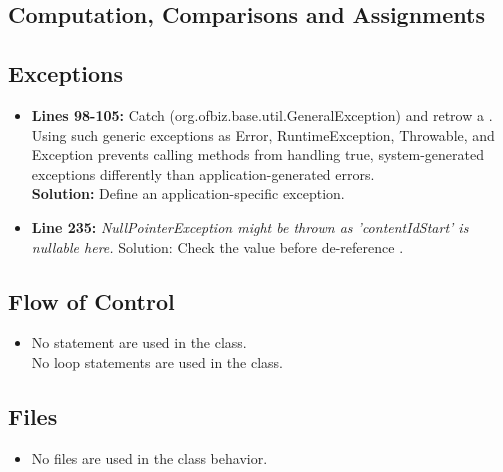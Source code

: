 \subsection{Computation, Comparisons and Assignments}
\subsection{Exceptions}
\begin{itemize}
\item \textbf{Lines 98-105:}
Catch  (org.ofbiz.base.util.GeneralException) and retrow a .
Using such generic exceptions as Error, RuntimeException, Throwable, and Exception prevents calling methods from handling true, system-generated exceptions differently than application-generated errors.\\
\textbf{Solution:} Define an application-specific exception.

\item \textbf{Line 235:} 
\textit{NullPointerException might be thrown as 'contentIdStart' is nullable here.}
Solution: Check the  value before de-reference .
\end{itemize}
\subsection{Flow of Control}
\begin{itemize}
	\item No  statement are used in the class.\\
	No loop statements are used in the class. 
\end{itemize}
\subsection{Files}
\begin{itemize}
	\item No files are used in the class behavior.
\end{itemize}
